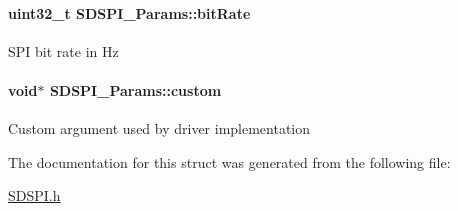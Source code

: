 \paragraph[{bit\-Rate}]{\setlength{\rightskip}{0pt plus 5cm}uint32\-\_\-t S\-D\-S\-P\-I\-\_\-\-Params\-::bit\-Rate}\label{struct_s_d_s_p_i___params_ad1885e9d1f89f0d756198454a9cefccb}
S\-P\-I bit rate in Hz 
\paragraph[{custom}]{\setlength{\rightskip}{0pt plus 5cm}void$\ast$ S\-D\-S\-P\-I\-\_\-\-Params\-::custom}\label{struct_s_d_s_p_i___params_ae5376d1a99dd29d9213c94b46df69ea8}
Custom argument used by driver implementation 

The documentation for this struct was generated from the following file\-:\begin{DoxyCompactItemize}
\item 
\hyperlink{_s_d_s_p_i_8h}{S\-D\-S\-P\-I.\-h}\end{DoxyCompactItemize}
